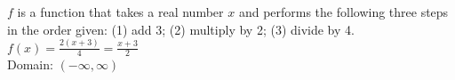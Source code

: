 {$f$ is a function that takes a real number $x$ and performs the following three steps in the order given: (1) add 3; (2) multiply by 2; (3) divide by 4. 
}
{$f(x) = \frac{2(x+3)}{4} = \frac{x+3}{2}$ \\  Domain:  $(-\infty, \infty)$ }